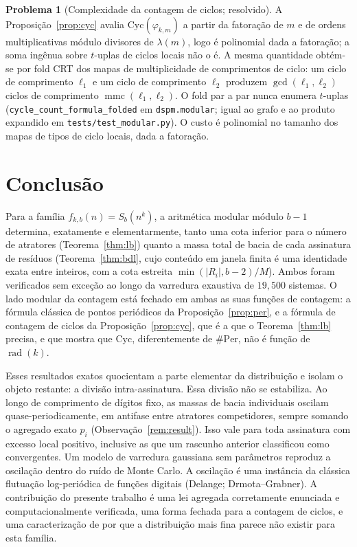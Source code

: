 \documentclass[11pt]{article}
\theoremstyle{definition}
\newtheorem{problem}[theorem]{Problema}
\theoremstyle{remark}
\newcommand{\Cyc}{\mathrm{Cyc}}
\newcommand{\Per}{\mathrm{Per}}
\DeclareMathOperator{\rad}{rad}
\DeclareMathOperator{\mmc}{mmc}
\begin{document}
\begin{problem}[Complexidade da contagem de ciclos; resolvido]
A Proposição~\ref{prop:cyc} avalia $\Cyc(\varphi_{k,m})$ a partir da fatoração de $m$ e de ordens multiplicativas módulo divisores de $\lambda(m)$, logo é polinomial dada a fatoração; a soma ingênua sobre $t$-uplas de ciclos locais não o é. A mesma quantidade obtém-se por fold CRT dos mapas de multiplicidade de comprimentos de ciclo: um ciclo de comprimento $\ell_1$ e um ciclo de comprimento $\ell_2$ produzem $\gcd(\ell_1,\ell_2)$ ciclos de comprimento $\mmc(\ell_1,\ell_2)$. O fold par a par nunca enumera $t$-uplas (\texttt{cycle\_count\_formula\_folded} em \texttt{dspm.modular}; igual ao grafo e ao produto expandido em \texttt{tests/test\_modular.py}). O custo é polinomial no tamanho dos mapas de tipos de ciclo locais, dada a fatoração.
\end{problem}

\section{Conclusão}

Para a família $f_{k,b}(n) = S_b(n^k)$, a aritmética modular módulo $b-1$ determina, exatamente e elementarmente, tanto uma cota inferior para o número de atratores (Teorema~\ref{thm:lb}) quanto a massa total de bacia de cada assinatura de resíduos (Teorema~\ref{thm:bdl}, cujo conteúdo em janela finita é uma identidade exata entre inteiros, com a cota estreita $\min(|R_i|,b-2)/M$). Ambos foram verificados sem exceção ao longo da varredura exaustiva de $19{,}500$ sistemas. O lado modular da contagem está fechado em ambas as suas funções de contagem: a fórmula clássica de pontos periódicos da Proposição~\ref{prop:per}, e a fórmula de contagem de ciclos da Proposição~\ref{prop:cyc}, que é a que o Teorema~\ref{thm:lb} precisa, e que mostra que $\Cyc$, diferentemente de $\#\Per$, não é função de $\rad(k)$.

Esses resultados exatos quocientam a parte elementar da distribuição e isolam o objeto restante: a divisão intra-assinatura. Essa divisão não se estabiliza. Ao longo de comprimento de dígitos fixo, as massas de bacia individuais oscilam quase-periodicamente, em antifase entre atratores competidores, sempre somando o agregado exato $p_i$ (Observação~\ref{rem:result}). Isso vale para toda assinatura com excesso local positivo, inclusive as que um rascunho anterior classificou como convergentes. Um modelo de varredura gaussiana sem parâmetros reproduz a oscilação dentro do ruído de Monte Carlo. A oscilação é uma instância da clássica flutuação log-periódica de funções digitais (Delange; Drmota--Grabner). A contribuição do presente trabalho é uma lei agregada corretamente enunciada e computacionalmente verificada, uma forma fechada para a contagem de ciclos, e uma caracterização de por que a distribuição mais fina parece não existir para esta família.
\end{document}
